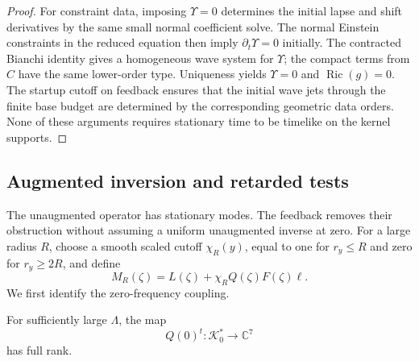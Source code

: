 \begin{proof}
For constraint data, imposing $\Upsilon=0$ determines the
initial lapse and shift derivatives by the same small normal
coefficient solve.  The normal Einstein constraints in the
reduced equation then imply $\partial_t\Upsilon=0$ initially.
The contracted Bianchi identity gives a homogeneous wave
system for $\Upsilon$; the compact terms from $C$ have the
same lower-order type.  Uniqueness yields $\Upsilon=0$ and
$\operatorname{Ric}(g)=0$.  The startup cutoff on feedback
ensures that the initial wave jets through the finite base
budget are determined by the corresponding geometric data
orders.  None of these arguments requires stationary time
to be timelike on the kernel supports.
\end{proof}

\subsection{Augmented inversion and retarded tests}

The unaugmented operator has stationary modes.  The feedback removes
their obstruction without assuming a uniform unaugmented inverse
at zero.  For a large radius $R$, choose a smooth scaled cutoff
$\chi_R(y)$, equal to one for $r_y\leq R$ and zero for
$r_y\geq2R$, and define
\begin{equation}\label{st:augmented-operator}
 M_R(\zeta)=L(\zeta)+\chi_R Q(\zeta)F(\zeta)\ell.
\end{equation}
We first identify the zero-frequency coupling.

\begin{lemma}\label{st:zero-coupling}
For sufficiently large $\Lambda$, the map
\[
 Q(0)^t:\mathcal K_0^*\longrightarrow\mathbb C^7
\]
has full rank.
\end{lemma}

